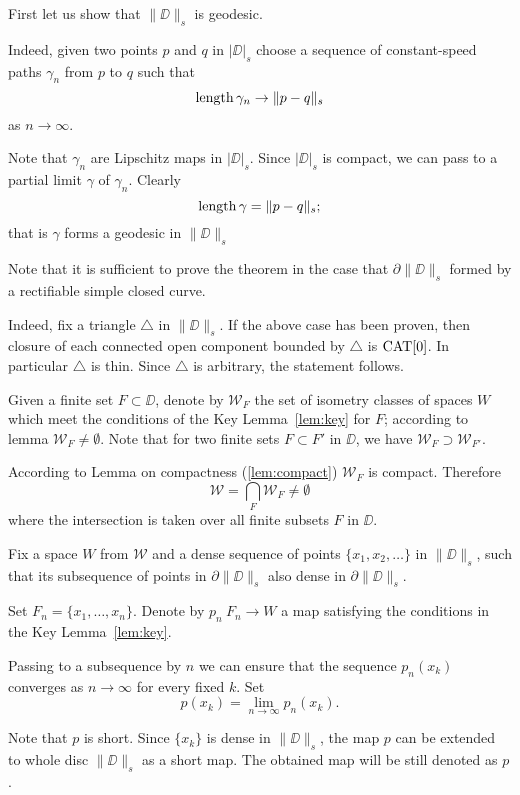 \documentclass[a4paper,10pt]{amsart}
\begin{document}
First let us show that $\|\DD\|_s$ is geodesic.

Indeed, given two points $p$ and $q$ in $|\DD|_s$ 
choose a sequence of constant-speed paths $\gamma_n$ from $p$ to $q$
such that 
\[\mathop{\rm length}\nolimits\gamma_n\to \|p-q\|_s\]
as $n\to\infty$.

Note that $\gamma_n$ are Lipschitz maps in $|\DD|_s$.
Since $|\DD|_s$ is compact, we can pass to a partial limit $\gamma$ of $\gamma_n$.
Clearly \[\mathop{\rm length}\nolimits\gamma= \|p-q\|_s;\]
that is $\gamma$ forms a geodesic in $\|\DD\|_s$


Note that it is sufficient to prove the theorem 
in the case that $\partial \|\DD\|_s$ formed by a rectifiable simple closed curve.

Indeed, fix a triangle $\triangle$ in $\|\DD\|_s$. 
If the above case has been proven, 
then closure of each connected open component bounded by $\triangle$ is $\mathop{\rm CAT}\nolimits[0]$.
In particular $\triangle$ is thin.
Since $\triangle$ is arbitrary, the statement follows.

Given a finite set $F\subset \DD$,
denote by $\mathcal{W}_F$
the set of isometry classes of spaces $W$ which meet the conditions of the Key Lemma~\ref{lem:key}
for $F$;
according to lemma $\mathcal{W}_F\ne\emptyset$.
Note that for two finite sets $F\subset F'$ in $\DD$,
we have $\mathcal{W}_F\supset \mathcal{W}_{F'}$.

According to Lemma on compactness (\ref{lem:compact}) $\mathcal{W}_F$ is compact.
Therefore 
\[\mathcal{W}
=
\bigcap_{F}\mathcal{W}_F\ne \emptyset\]
where the intersection is taken over all finite subsets $F$ in $\DD$. 

Fix a space $W$ from $\mathcal{W}$
and a dense sequence of points $\{x_1,x_2,\dots\}$ in $\|\DD\|_s$, 
such that its subsequence of points in $\partial \|\DD\|_s$
 also dense in $\partial \|\DD\|_s$.

Set $F_n=\{x_1,\dots,x_n\}$.
Denote by $p_n\:F_n\to W$ a map satisfying the conditions in the Key Lemma~\ref{lem:key}.

Passing to a subsequence by $n$ we can ensure that the sequence
$p_n(x_k)$ converges as $n\to\infty$ for every fixed $k$.
Set 
\[p(x_k)=\lim_{n\to\infty} p_n(x_k).\]

Note that $p$ is short.
Since $\{x_k\}$ is dense in $\|\DD\|_s$,
the map $p$ can be extended to whole disc $\|\DD\|_s$ 
as a short map.
The obtained map will be still denoted as $p$.
\end{document}

